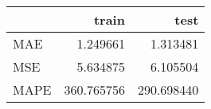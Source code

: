 \begin{tabular}{lrr}
\toprule
{} &       train &        test \\
\midrule
MAE  &    1.249661 &    1.313481 \\
MSE  &    5.634875 &    6.105504 \\
MAPE &  360.765756 &  290.698440 \\
\bottomrule
\end{tabular}
